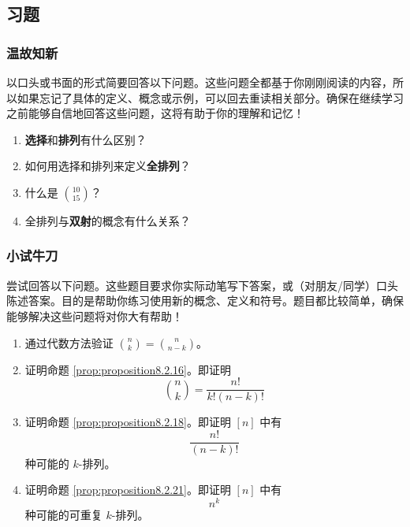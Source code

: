 
\subsection{习题}\label{sec:section8.2.4}

\subsubsection*{温故知新}

以口头或书面的形式简要回答以下问题。这些问题全都基于你刚刚阅读的内容，所以如果忘记了具体的定义、概念或示例，可以回去重读相关部分。确保在继续学习之前能够自信地回答这些问题，这将有助于你的理解和记忆！

\begin{enumerate}[label=(\arabic*)]
    \item \textbf{选择}和\textbf{排列}有什么区别？
    \item 如何用选择和排列来定义\textbf{全排列}？
    \item 什么是 ${10 \choose 15}$？
    \item 全排列与\textbf{双射}的概念有什么关系？
\end{enumerate}

\subsubsection*{小试牛刀}

尝试回答以下问题。这些题目要求你实际动笔写下答案，或（对朋友/同学）口头陈述答案。目的是帮助你练习使用新的概念、定义和符号。题目都比较简单，确保能够解决这些问题将对你大有帮助！

\begin{enumerate}[label=(\arabic*)]
    \item 通过代数方法验证 ${n \choose k} = {n \choose {n-k}}$。
    \item 证明命题 \ref{prop:proposition8.2.16}。即证明
        \[{n \choose k} = \frac{n!}{k!(n-k)!}\]\label{exc:exercises8.2.2}
    \item 证明命题 \ref{prop:proposition8.2.18}。即证明 $[n]$ 中有
        \[\frac{n!}{(n-k)!}\]
        种可能的 $k$-排列。\label{exc:exercises8.2.3}
    \item 证明命题 \ref{prop:proposition8.2.21}。即证明 $[n]$ 中有
        \[n^k\]
        种可能的可重复 $k$-排列。\label{exc:exercises8.2.4}
\end{enumerate}